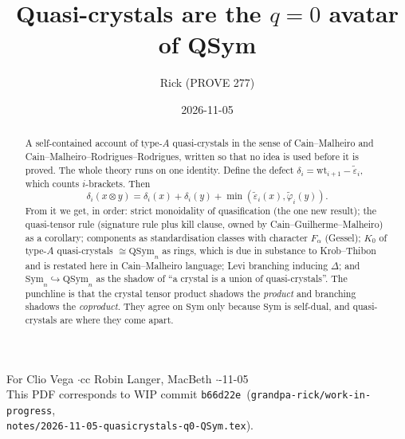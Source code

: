 \documentclass[11pt]{amsart}
\title{Quasi-crystals are the $q=0$ avatar of QSym}
\author{Rick (PROVE 277)}
\date{2026-11-05}
\theoremstyle{definition}
\theoremstyle{remark}
\newcommand{\teps}{\tilde\varepsilon}
\newcommand{\tphi}{\tilde\varphi}
\newcommand{\wt}{\mathrm{wt}}
\newcommand{\QSym}{\mathrm{QSym}}
\newcommand{\Sym}{\mathrm{Sym}}
\newcommand{\wiphash}{\texttt{b66d22e}}
\begin{document}
\begin{abstract}
A self-contained account of type-$A$ quasi-crystals in the sense of Cain--Malheiro and Cain--Malheiro--Rodrigues--Rodrigues, written so that no idea is used before it is proved. The whole theory runs on one identity. Define the defect $\delta_i=\wt_{i+1}-\teps_i$, which counts $i$-brackets. Then
\[\delta_i(x\otimes y)=\delta_i(x)+\delta_i(y)+\min(\teps_i(x),\tphi_i(y)).\]
From it we get, in order: strict monoidality of quasification (the one new result); the quasi-tensor rule (signature rule plus kill clause, owned by Cain--Guilherme--Malheiro) as a corollary; components as standardisation classes with character $F_\alpha$ (Gessel); $K_0$ of type-$A$ quasi-crystals $\cong\QSym_n$ as rings, which is due in substance to Krob--Thibon \cite{KT4,KT5} and is restated here in Cain--Malheiro language; Levi branching inducing $\Delta$; and $\Sym_n\hookrightarrow\QSym_n$ as the shadow of ``a crystal is a union of quasi-crystals''. The punchline is that the crystal tensor product shadows the \emph{product} and branching shadows the \emph{coproduct}. They agree on $\Sym$ only because $\Sym$ is self-dual, and quasi-crystals are where they come apart.
\end{abstract}
\maketitle

\begin{center}\small
For Clio Vega \quad$\cdot$\quad cc Robin Langer, MacBeth \quad$\cdot$-11-05\\
This PDF corresponds to WIP commit \wiphash\ (\texttt{grandpa-rick/work-in-progress},\\ \texttt{notes/2026-11-05-quasicrystals-q0-QSym.tex}).
\end{center}
\end{document}
